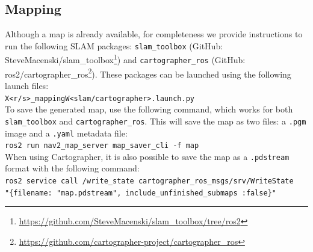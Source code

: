 \subsection{Mapping}
Although a map is already available, for completeness we provide instructions to run the following SLAM packages: \texttt{slam\_toolbox}\cite{Macenski2021} (GitHub: SteveMacenski/slam\_toolbox\footnote{\href{https://github.com/SteveMacenski/slam_toolbox/tree/ros2}{https://github.com/SteveMacenski/slam\_toolbox/tree/ros2}}) and \texttt{cartographer\_ros}\cite{45466} (GitHub: ros2/cartographer\_ros\footnote{\href{https://github.com/cartographer-project/cartographer_ros}{https://github.com/cartographer-project/cartographer\_ros}}). These packages can be launched using the following launch files:\\
\hspace*{10mm} \texttt{X<r/s>\_mappingW<slam/cartographer>.launch.py} \\
To save the generated map, use the following command, which works for both  \texttt{slam\_toolbox} and \texttt{cartographer\_ros}. This will save the map as two files:  a \texttt{.pgm} image and a \texttt{.yaml} metadata file:\\
\hspace*{10mm} \texttt{ros2 run nav2\_map\_server map\_saver\_cli -f map}\\
When using Cartographer, it is also possible to save the map as a \texttt{.pdstream} format with the following command:\\
    \hspace*{10mm} \texttt{ros2 service call /write\_state cartographer\_ros\_msgs/srv/WriteState\\ 
    \hspace*{15mm}"\{filename: "map.pdstream", include\_unfinished\_submaps :false\}"}
\newpage
